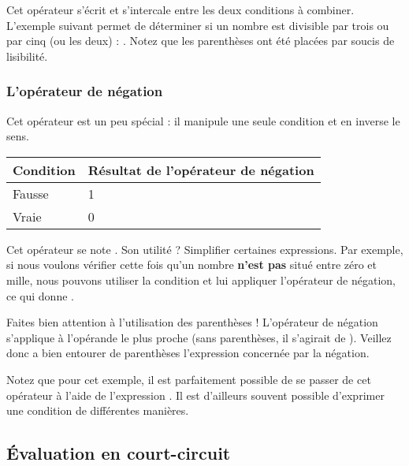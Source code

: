 Cet opérateur s'écrit \mybox{\textbar{}\textbar{}} et s'intercale entre
les deux conditions à combiner. L'exemple suivant permet de déterminer
si un nombre est divisible par trois ou par cinq (ou les deux) :
.
Notez que les parenthèses ont été placées par soucis de lisibilité.

\subsubsection{L'opérateur de négation}
\label{loperateur-de-negation}

Cet opérateur est un peu spécial : il manipule une seule condition et en
inverse le sens.

\begin{table}[ht!]
\centering
\begin{tabular}{|l|l|}\hline
\rowcolor{gris-tab-entete}\textbf{Condition} & \textbf{Résultat de l'opérateur de négation}\tabularnewline\hline
Fausse & 1\tabularnewline\hline
Vraie & 0\tabularnewline\hline
\end{tabular}
\end{table}


Cet opérateur se note \mybox{!}. Son utilité ? Simplifier certaines
expressions. Par exemple, si nous voulons vérifier cette fois qu'un
nombre \textbf{n'est pas} situé entre zéro et mille, nous pouvons
utiliser la condition
 et lui
appliquer l'opérateur de négation, ce qui donne
.

\begin{attentionbox}
 Faites bien attention à l'utilisation
des parenthèses ! L'opérateur de négation s'applique à l'opérande le
plus proche (sans parenthèses, il s'agirait de ). Veillez donc
a bien entourer de parenthèses l'expression concernée par la négation.
\end{attentionbox}

\begin{infobox}
Notez que pour cet exemple, il est parfaitement possible de se passer de cet opérateur à l'aide de
l'expression .
Il est d'ailleurs souvent possible d'exprimer une condition de
différentes manières.
\end{infobox}

\subsection{Évaluation en court-circuit}
\label{evaluation-en-court-circuit}

